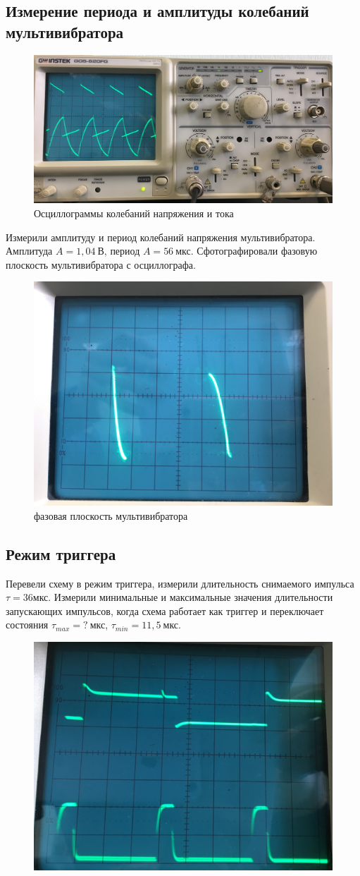 \documentclass[a4paper,14pt]{extarticle}
\begin{document}
\subsection*{Измерение периода и амплитуды колебаний мультивибратора}
\begin{figure}[H]
	\centering
	\includegraphics[width=0.7\linewidth]{photo/IMG_3234}
	\caption{Осциллограммы колебаний напряжения и тока}
\end{figure}
Измерили амплитуду и период колебаний напряжения мультивибратора. Амплитуда $A=1,04\:\text{В}$, период $A=56\:\text{мкс}$.
Сфотографировали фазовую плоскость мультивибратора с осциллографа.
\begin{figure}[H]
	\centering
	\includegraphics[width=0.7\linewidth]{photo/IMG_3240}
	\caption{фазовая плоскость мультивибратора}
\end{figure}
\subsection*{Режим триггера}
Перевели схему в режим триггера, измерили длительность снимаемого импульса $\tau = 36\text{мкс}$.
Измерили минимальные и максимальные значения длительности запускающих импульсов, когда схема работает как триггер и переключает состояния $\tau_{max} = ?\:\text{мкс}$, $\tau_{min} = 11,5\:\text{мкс}$.
\begin{figure}[H]
	\centering
	\includegraphics[width=0.6\linewidth]{photo/IMG_3244}
\end{figure}
\end{document}

